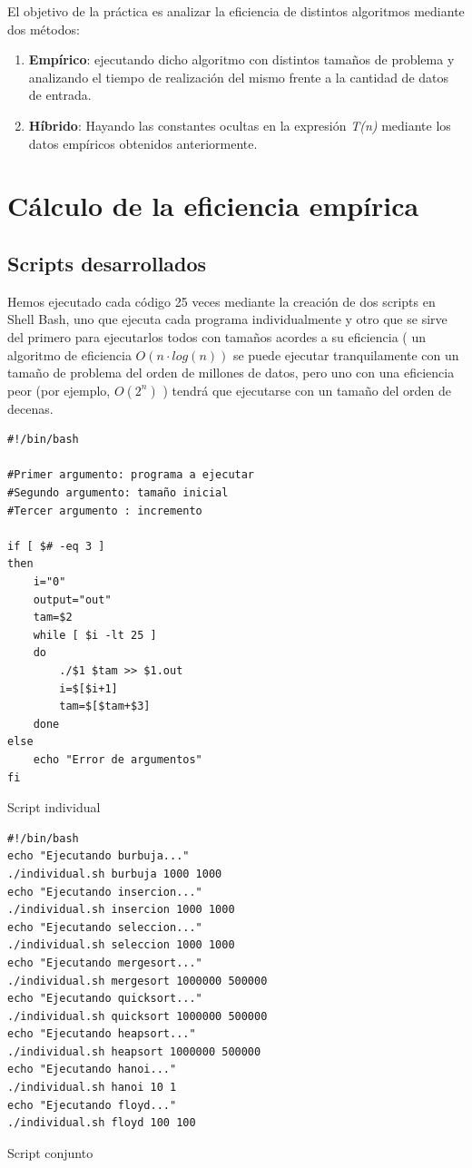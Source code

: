 \documentclass[12pt,spanish]{article}
\begin{document}
El objetivo de la práctica es analizar la eficiencia de distintos algoritmos mediante dos métodos:
\begin{enumerate}
\item \textbf{Empírico}: ejecutando dicho algoritmo con distintos tamaños de problema y analizando el tiempo de realización del mismo frente a la cantidad de datos de entrada.
\item \textbf{Híbrido}: Hayando las constantes ocultas en la expresión \textit{T(n)} mediante los datos empíricos obtenidos anteriormente.
\end{enumerate}

\section{Cálculo de la eficiencia empírica}
\subsection{Scripts desarrollados}
Hemos ejecutado cada código 25 veces mediante la creación de dos scripts en Shell Bash, uno que ejecuta cada programa individualmente y otro que se sirve del primero para ejecutarlos todos con tamaños acordes a su eficiencia ( un algoritmo de eficiencia $O(n \cdot log(n))$ se puede ejecutar tranquilamente con un tamaño de problema del orden de millones de datos, pero uno con una eficiencia peor (por ejemplo, $O(2^n)$ ) tendrá que ejecutarse con un tamaño del orden de decenas.
\begin{listing}[H]
\begin{verbatim}
#!/bin/bash

#Primer argumento: programa a ejecutar
#Segundo argumento: tamaño inicial
#Tercer argumento : incremento

if [ $# -eq 3 ]
then
    i="0"
    output="out"
    tam=$2
    while [ $i -lt 25 ]
    do
        ./$1 $tam >> $1.out
        i=$[$i+1]
        tam=$[$tam+$3]
    done
else
    echo "Error de argumentos"
fi
\end{verbatim}
\caption{Script individual}
\end{listing}
\newpage

\begin{listing}[H]
\begin{verbatim}
#!/bin/bash
echo "Ejecutando burbuja..."
./individual.sh burbuja 1000 1000
echo "Ejecutando insercion..."
./individual.sh insercion 1000 1000
echo "Ejecutando seleccion..."
./individual.sh seleccion 1000 1000
echo "Ejecutando mergesort..."
./individual.sh mergesort 1000000 500000
echo "Ejecutando quicksort..."
./individual.sh quicksort 1000000 500000
echo "Ejecutando heapsort..."
./individual.sh heapsort 1000000 500000
echo "Ejecutando hanoi..."
./individual.sh hanoi 10 1
echo "Ejecutando floyd..."
./individual.sh floyd 100 100
\end{verbatim}
\caption{Script conjunto}
\end{listing}
\end{document}
